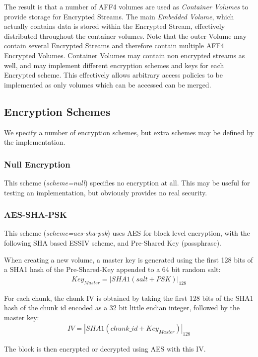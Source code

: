 \documentclass[10pt, conference]{IEEEtran}
\begin{document}
The result is that a number of AFF4 volumes are used as {\em Container
Volumes} to provide storage for Encrypted Streams. The main {\em
Embedded Volume}, which actually contains data is stored within the
Encrypted Stream, effectively distributed throughout the container
volumes. Note that the outer Volume may contain several Encrypted
Streams and therefore contain multiple AFF4 Encrypted 
Volumes. Container Volumes may contain non encrypted streams as well,
and may implement different encryption schemes and keys for each
Encrypted scheme. This effectively allows arbitrary access policies to
be implemented as only volumes which can be accessed can be merged.

\subsection{Encryption Schemes}
We specify a number of encryption schemes, but extra schemes may be
defined by the implementation.

\subsubsection{Null Encryption}
This scheme ({\em scheme=null}) specifies no encryption at all. This
may be useful for testing an implementation, but obviously provides
no real security.

\subsubsection{AES-SHA-PSK}
This scheme ({\em scheme=aes-sha-psk}) uses AES for block level
encryption, with the following SHA based ESSIV scheme, and Pre-Shared
Key (passphrase).

When creating a new volume, a master key is generated using the first
128 bits of a SHA1 hash of the Pre-Shared-Key appended to a 64 bit
random salt:
\begin{eqnarray}
Key_{Master} = \left | SHA1(salt + PSK) \right | _{128}
\end{eqnarray}

For each chunk, the chunk IV is obtained by taking the first 128 bits
of the SHA1 hash of the chunk id encoded as a 32 bit little endian
integer, followed by the master key:
\begin{eqnarray}
IV = \left | SHA1(chunk\_id + Key_{Master}) \right | _{128}
\end{eqnarray}

The block is then encrypted or decrypted using AES with this IV.
\end{document}
